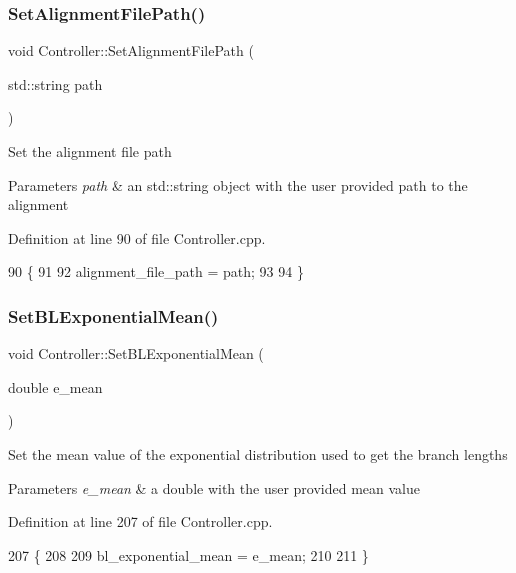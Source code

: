 \subsubsection{\texorpdfstring{Set\+Alignment\+File\+Path()}{SetAlignmentFilePath()}}
{\footnotesize\ttfamily void Controller\+::\+Set\+Alignment\+File\+Path (\begin{DoxyParamCaption}\item[{std\+::string}]{path }\end{DoxyParamCaption})}

Set the alignment file path 
\begin{DoxyParams}{Parameters}
{\em path} & an std\+::string object with the user provided path to the alignment \\
\hline
\end{DoxyParams}


Definition at line 90 of file Controller.\+cpp.


\begin{DoxyCode}
90                                                     \{
91   
92   alignment\_file\_path = path;
93   
94 \}
\end{DoxyCode}
\mbox{\label{classController_ab3192e74f31bbe2e7faf70d497c67e9b}} 
\subsubsection{\texorpdfstring{Set\+B\+L\+Exponential\+Mean()}{SetBLExponentialMean()}}
{\footnotesize\ttfamily void Controller\+::\+Set\+B\+L\+Exponential\+Mean (\begin{DoxyParamCaption}\item[{double}]{e\+\_\+mean }\end{DoxyParamCaption})}

Set the mean value of the exponential distribution used to get the branch lengths 
\begin{DoxyParams}{Parameters}
{\em e\+\_\+mean} & a double with the user provided mean value \\
\hline
\end{DoxyParams}


Definition at line 207 of file Controller.\+cpp.


\begin{DoxyCode}
207                                                   \{
208   
209   bl\_exponential\_mean = e\_mean;
210   
211 \}
\end{DoxyCode}
\mbox{\label{classController_ab75b88551fab21ddd99e748e21f6a334}} 

